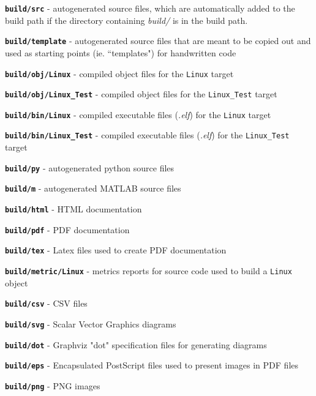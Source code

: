 \vspace{5mm} %
\begin{spaceditemize}
  \item \textbf{\texttt{build/src}} - autogenerated source files, which are automatically added to the build path if the directory containing \textit{build/} is in the build path.
  \item \textbf{\texttt{build/template}} - autogenerated source files that are meant to be copied out and used as starting points (ie. ``templates") for handwritten code
  \item \textbf{\texttt{build/obj/Linux}} - compiled object files for the \texttt{Linux} target
  \item \textbf{\texttt{build/obj/Linux\_Test}} - compiled object files for the \texttt{Linux\_Test} target
  \item \textbf{\texttt{build/bin/Linux}} - compiled executable files (\textit{.elf}) for the \texttt{Linux} target
  \item \textbf{\texttt{build/bin/Linux\_Test}} - compiled executable files (\textit{.elf}) for the \texttt{Linux\_Test} target
  \item \textbf{\texttt{build/py}} - autogenerated python source files
  \item \textbf{\texttt{build/m}} - autogenerated MATLAB source files
  \item \textbf{\texttt{build/html}} - HTML documentation
  \item \textbf{\texttt{build/pdf}} - PDF documentation
  \item \textbf{\texttt{build/tex}} - Latex files used to create PDF documentation
  \item \textbf{\texttt{build/metric/Linux}} - metrics reports for source code used to build a \texttt{Linux} object
  \item \textbf{\texttt{build/csv}} - CSV files
  \item \textbf{\texttt{build/svg}} - Scalar Vector Graphics diagrams
  \item \textbf{\texttt{build/dot}} - Graphviz "dot" specification files for generating diagrams
  \item \textbf{\texttt{build/eps}} - Encapsulated PostScript files used to present images in PDF files
  \item \textbf{\texttt{build/png}} - PNG images
\end{spaceditemize}
\vspace{5mm} %

